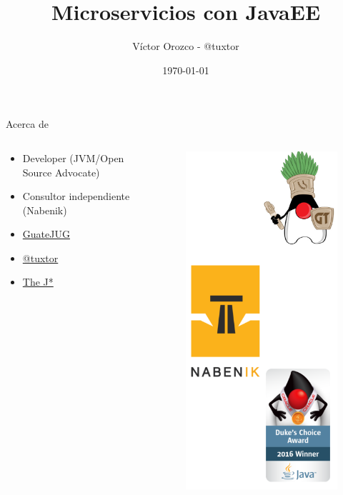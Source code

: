 \documentclass{beamer}
\title{Microservicios con JavaEE}
\author{Víctor Orozco - @tuxtor}
\institute{GuateJUG}
\date{\today}
\begin{document}
\frame{\titlepage}

\begin{frame}{Acerca de}
\begin{columns}[T] %
	\begin{column}[T]{5cm} %
		\begin{itemize}
			\item Developer (JVM/Open Source Advocate)
			\item Consultor independiente (Nabenik)
			\item \href{https://twitter.com/tuxtor}{GuateJUG}
			\item \href{https://twitter.com/tuxtor}{@tuxtor}
			\item \href{http://vorozco.com}{The J*} 
		\end{itemize}
	\end{column}
	\begin{column}[T]{5cm} %
		\begin{figure}
			\centering
			\includegraphics[width=0.7\linewidth]{Images/logos}
		\end{figure}
		
	\end{column}
\end{columns}
\end{frame}
\end{document}
